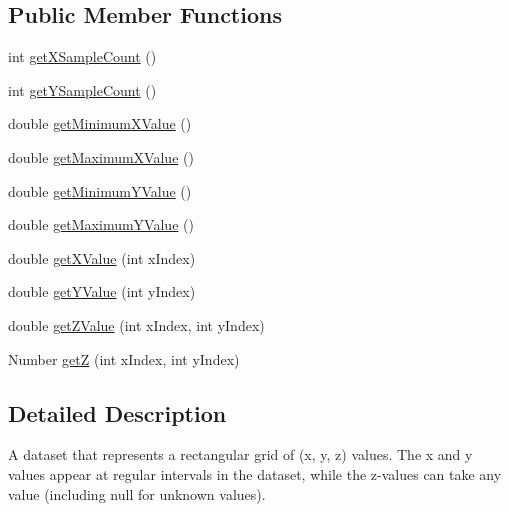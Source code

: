 \subsection*{Public Member Functions}
\begin{DoxyCompactItemize}
\item 
int \mbox{\hyperlink{interfaceorg_1_1jfree_1_1data_1_1general_1_1_heat_map_dataset_ada47a69a69c446d7f519d6bf05a47f6f}{get\+X\+Sample\+Count}} ()
\item 
int \mbox{\hyperlink{interfaceorg_1_1jfree_1_1data_1_1general_1_1_heat_map_dataset_adc230b763b1adc1b0af0210cc68760c6}{get\+Y\+Sample\+Count}} ()
\item 
double \mbox{\hyperlink{interfaceorg_1_1jfree_1_1data_1_1general_1_1_heat_map_dataset_aa2c36fac599d77d64ea85f069eba243c}{get\+Minimum\+X\+Value}} ()
\item 
double \mbox{\hyperlink{interfaceorg_1_1jfree_1_1data_1_1general_1_1_heat_map_dataset_a252f69b25ce64302493167c5e8576cfe}{get\+Maximum\+X\+Value}} ()
\item 
double \mbox{\hyperlink{interfaceorg_1_1jfree_1_1data_1_1general_1_1_heat_map_dataset_ad3b85b7cbe6b7bb308701f5a58613903}{get\+Minimum\+Y\+Value}} ()
\item 
double \mbox{\hyperlink{interfaceorg_1_1jfree_1_1data_1_1general_1_1_heat_map_dataset_a263e6f91dd132e3c82bb71902f37e73c}{get\+Maximum\+Y\+Value}} ()
\item 
double \mbox{\hyperlink{interfaceorg_1_1jfree_1_1data_1_1general_1_1_heat_map_dataset_a9643f543086498022123fc43301c4788}{get\+X\+Value}} (int x\+Index)
\item 
double \mbox{\hyperlink{interfaceorg_1_1jfree_1_1data_1_1general_1_1_heat_map_dataset_a688282ee25f73c73ac1b0686bfbbe88f}{get\+Y\+Value}} (int y\+Index)
\item 
double \mbox{\hyperlink{interfaceorg_1_1jfree_1_1data_1_1general_1_1_heat_map_dataset_ad4c5c315a22d263edf0da447693fb0d7}{get\+Z\+Value}} (int x\+Index, int y\+Index)
\item 
Number \mbox{\hyperlink{interfaceorg_1_1jfree_1_1data_1_1general_1_1_heat_map_dataset_a9f2a3fb4e25c9364781e0aeb32ef91c5}{getZ}} (int x\+Index, int y\+Index)
\end{DoxyCompactItemize}


\subsection{Detailed Description}
A dataset that represents a rectangular grid of (x, y, z) values. The x and y values appear at regular intervals in the dataset, while the z-\/values can take any value (including {\ttfamily null} for unknown values).

